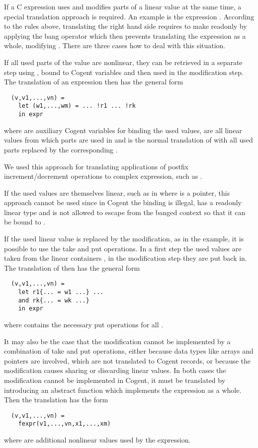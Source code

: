 If a C expression uses and modifies parts of a linear value at the same time, a special translation approach is required.
An example is the expression . According to the rules above, translating the right hand side
requires to make  readonly by applying the bang operator \code{!} which then prevents translating the expression
as a whole, modifying . There are three cases how to deal with this situation.

If all used parts of the value are nonlinear, they can be retrieved in a separate step using \code{!}, bound to Cogent 
variables and then used in the modification step. The translation of an expression  then has the general form
\begin{verbatim}
  (v,v1,...,vn) = 
    let (w1,...,wm) = ... !r1 ... !rk
    in expr
\end{verbatim}
where  are auxiliary Cogent variables for binding the used values,  are all linear values
from which parts are used in  and  is the 
normal translation of  with all used parts replaced by the corresponding .

We used this approach for translating applications of postfix increment/decrement operations to complex expression,
such as .

If the used values are themselves linear, such as in  where  is a pointer, this approach
cannot be used since in Cogent the binding  is illegal,  has a readonly linear type and
is not allowed to escape from the banged context so that it can be bound to .

If the used linear value is replaced by the modification, as in the example, it is possible to use the take and put
operations. In a first step the used values are taken from the linear containers , in the modification
step they are put back in. The translation of  then has the general form
\begin{verbatim}
  (v,v1,...,vn) = 
    let r1{... = w1 ...} ...
    and rk{... = wk ...}
    in expr
\end{verbatim}
where  contains the necessary put operations for all .

It may also be the case that the modification cannot be implemented by a combination of take and put operations, either 
because data types like arrays and pointers are involved, which are not translated to Cogent records, or because
the modification causes sharing or discarding linear values. In both cases the modification cannot be implemented in
Cogent, it must be translated by introducing an abstract function  which implements the expression 
as a whole. Then the translation has the form
\begin{verbatim}
  (v,v1,...,vn) = 
    fexpr(v1,...,vn,x1,...,xm)
\end{verbatim}
where  are additional nonlinear values used by the expression.


